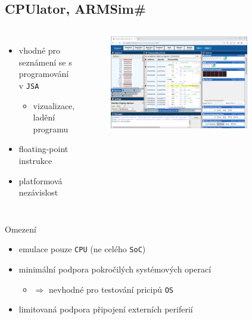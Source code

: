 \documentclass[compress]{beamer}
\begin{document}
\subsection{CPUlator, ARMSim\#}

\begin{frame}
	\begin{columns}
		\begin{itemize}
			\item vhodné pro seznámení se s programování v \texttt{JSA}
			\begin{itemize}
				\item vizualizace, ladění programu
			\end{itemize}
			\item floating-point instrukce
			\item platformová nezávislost
		\end{itemize}
		\begin{figure}
			\centering
			\includegraphics[width=0.8\textwidth]{img/cpulator.png}
			\caption{\href{https://cpulator.01xz.net}{}}
			\label{CPUlator}
		\end{figure}
	\end{columns}
	\noindent\makebox[\linewidth]{\rule{\textwidth}{0.4pt}}
	\begin{block}{Omezení}
		\begin{itemize}
			\item emulace pouze \texttt{CPU} (ne celého \texttt{SoC})
			\item minimální podpora pokročilých systémových operací
			\begin{itemize}
				\item $\Rightarrow$ nevhodné pro testování pricipů \texttt{OS}
			\end{itemize}
			\item limitovaná podpora připojení externích periferií
		\end{itemize}
	\end{block}
\end{frame}
\end{document}
